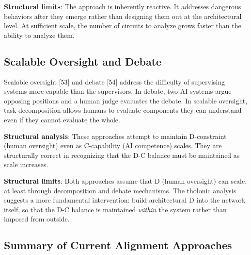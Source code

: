 \documentclass[12pt]{article}
\begin{document}
\textbf{Structural limits}: The approach is inherently reactive. It
addresses dangerous behaviors after they emerge rather than designing
them out at the architectural level. At sufficient scale, the number of
circuits to analyze grows faster than the ability to analyze them.

\subsection{Scalable Oversight and Debate}\label{scalable-oversight-and-debate}

Scalable oversight {[}53{]} and debate {[}54{]} address the difficulty
of supervising systems more capable than the supervisors. In debate, two
AI systems argue opposing positions and a human judge evaluates the
debate. In scalable oversight, task decomposition allows humans to
evaluate components they can understand even if they cannot evaluate the
whole.

\textbf{Structural analysis}: These approaches attempt to maintain
D-constraint (human oversight) even as C-capability (AI competence)
scales. They are structurally correct in recognizing that the D-C
balance must be maintained as scale increases.

\textbf{Structural limits}: Both approaches assume that D (human
oversight) can scale, at least through decomposition and debate
mechanisms. The tholonic analysis suggests a more fundamental
intervention: build architectural D into the network itself, so that the
D-C balance is maintained \emph{within} the system rather than imposed
from outside.

\subsection{Summary of Current Alignment Approaches}\label{summary-of-current-alignment-approaches}
\end{document}
